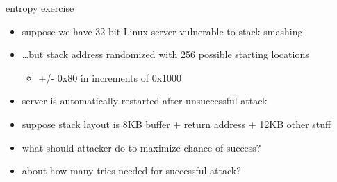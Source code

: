 \begin{frame}{entropy exercise}
    \begin{itemize}
    \item suppose we have 32-bit Linux server vulnerable to stack smashing
    \item \ldots but stack address randomized with 256 possible starting locations
        \begin{itemize}
        \item +/- 0x80 in increments of 0x1000
        \end{itemize}
    \item server is automatically restarted after unsuccessful attack
    \item suppose stack layout is 8KB buffer + return address + 12KB other stuff
    \item what should attacker do to maximize chance of success?
    \item about how many tries needed for successful attack?
    \end{itemize}
\end{frame}
